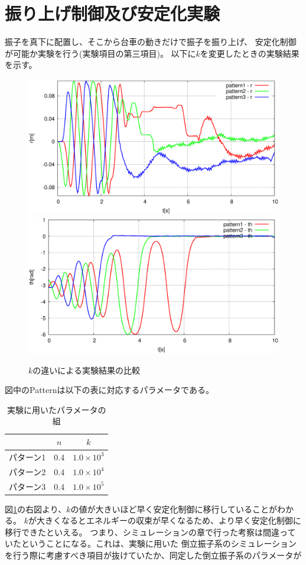 \section{振り上げ制御及び安定化実験}
	振子を真下に配置し、そこから台車の動きだけで振子を振り上げ、
	安定化制御が可能か実験を行う(実験項目の第三項目)。
	以下に$k$を変更したときの実験結果を示す。
	\begin{figure}[H]
		\centering
		\includegraphics[width=0.49\linewidth]{gazo/Hexpe_R.eps}
		\includegraphics[width=0.49\linewidth]{gazo/Hexpe_TH.eps}
		\caption{$k$の違いによる実験結果の比較}
		\label{image:Hexpe}
	\end{figure}
	図中のPatternは以下の表に対応するパラメータである。
	\begin{table}[H]
		\begin{center}
			\caption{実験に用いたパラメータの組}
			\medskip
			
			\begin{tabular}{|c|c|c|}\hline
				& $n$ & $k$ \\ \hline\hline
				パターン1 & 0.4 & $1.0×10^3$  \\ \hline
				パターン2 & 0.4 & $1.0×10^4$  \\ \hline
				パターン3 & 0.4 & $1.0×10^5$  \\ \hline
			\end{tabular}
		\end{center}
		\label{table:huriage_huriage}
	\end{table}
	図\ref{image:Hexpe}の右図より、$k$の値が大きいほど早く安定化制御に移行していることがわかる。
	$k$が大きくなるとエネルギーの収束が早くなるため、より早く安定化制御に移行できたといえる。
	つまり、シミュレーションの章で行った考察は間違っていたということになる。これは、実験に用いた
	倒立振子系のシミュレーションを行う際に考慮すべき項目が抜けていたか、同定した倒立振子系のパラメータが
